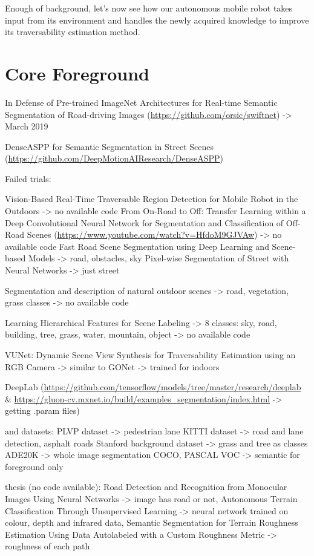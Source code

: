 \documentclass[12pt,a4paper]{report}
\begin{document}
	Enough of background, let’s now see how our autonomous mobile robot takes input 
	from its environment and handles the newly acquired knowledge to improve its 
	traversability estimation method.
	\\
	
	
	\chapter{Core Foreground}
	\label{sec:fg}
	
	In Defense of Pre-trained ImageNet Architectures for Real-time Semantic Segmentation of Road-driving Images (\url{https://github.com/orsic/swiftnet}) -> March 2019
	
	DenseASPP for Semantic Segmentation in Street Scenes (\url{https://github.com/DeepMotionAIResearch/DenseASPP})
		
	Failed trials:
	
	Vision-Based Real-Time Traversable Region Detection for Mobile Robot in the Outdoors -> no available code
	From On-Road to Off: Transfer Learning within a Deep Convolutional Neural Network for Segmentation and Classification of Off-Road Scenes (\url{https://www.youtube.com/watch?v=HfdoM9GJVAw})  ->  no available code
	Fast Road Scene Segmentation using Deep Learning and Scene-based Models -> road, obstacles, sky
	Pixel-wise Segmentation of Street with Neural Networks -> just street
	
	Segmentation and description of natural outdoor scenes -> road, vegetation, grass classes -> no available code
	
	Learning Hierarchical Features for Scene Labeling -> 8 classes: sky, road, building, tree, grass, water, mountain, object -> no available code
	
	VUNet: Dynamic Scene View Synthesis for Traversability Estimation using an RGB Camera -> similar to GONet -> trained for indoors
	
	DeepLab (\url{https://github.com/tensorflow/models/tree/master/research/deeplab} 
	\& \url{https://gluon-cv.mxnet.io/build/examples_segmentation/index.html} -> getting .param files)
	
	and datasets:
	PLVP dataset -> pedestrian lane
	KITTI dataset -> road and lane detection, asphalt roads
	Stanford background dataset -> grass and tree as classes
	ADE20K -> whole image segmentation
	COCO, PASCAL VOC -> semantic for foreground only
	
	thesis (no code available):
	Road Detection and Recognition from Monocular Images Using Neural Networks -> image has road or not,
	Autonomous Terrain Classification Through Unsupervised Learning -> neural network trained on colour, depth and infrared data,
	Semantic Segmentation for Terrain Roughness Estimation Using Data Autolabeled with a Custom Roughness Metric -> roughness of each path
	\\\\
	
\end{document}

